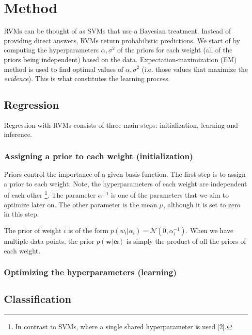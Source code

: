 \section{Method}
RVMs can be thought of as SVMs that use a Bayesian treatment. Instead of providing direct answers, RVMs return probabilistic predictions. We start of by computing the hyperparameters $\alpha,\sigma^2$ of the priors for each weight (all of the priors being independent) based on the data. Expectation-maximization (EM) method is used to  find optimal values of $\alpha,\sigma^2$ (i.e. those values that maximize the \textit{evidence}). This is what constitutes the learning process. %


\subsection{Regression}
Regression with RVMs consists of three main steps: initialization, learning and inference. 
\subsubsection{Assigning a prior to each weight (initialization)} Priors control the importance of a given basis function. The first step is to assign a prior to each weight. Note, the hyperparameters of each weight are independent of each other \footnote{In contrast to SVMs, where a single shared hyperparameter is used [2].}. The parameter $\alpha^{-1}$ is one of the parameters that we aim to optimize later on. The other parameter is the mean $\mu$, although it is set to zero in this step.

The prior of weight $i$ is of the form $p(w_i|\alpha_i)=\mathcal{N}(0,\alpha_{i}^{-1})$. When we have multiple data points, the prior $p(\boldsymbol{w}|\boldsymbol{\alpha})$ is simply the product of all the priors of each weight.

\subsubsection{Optimizing the hyperparameters (learning)}


\subsection{Classification}